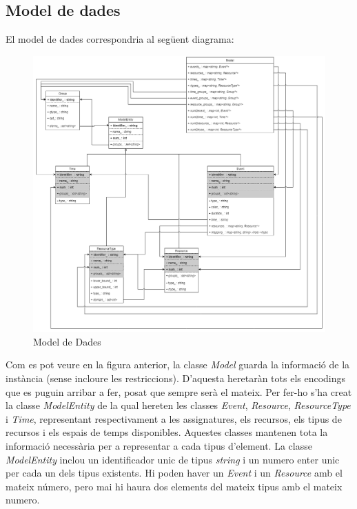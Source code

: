 \documentclass[11pt,a4paper,twoside]{report}
\begin{document}
  \subsection{Model de dades}

  El model de dades correspondria al següent diagrama:
  \begin{figure}[H]
    \includegraphics[width=\textwidth]{Diagrames/ModelDades.png}
    \caption{Model de Dades}
    \label{fig:DataModel}
  \end{figure}

  Com es pot veure en la figura anterior, la classe \textit{Model} guarda la informació de la instància (sense incloure les restriccions). D'aquesta heretaràn tots els encodings que es puguin arribar a fer, posat que sempre serà el mateix.
  Per fer-ho s'ha creat la classe \textit{ModelEntity} de la qual hereten les classes \textit{Event}, \textit{Resource}, \textit{ResourceType} i \textit{Time},
  representant respectivament a les assignatures, els recursos, els tipus de recursos i els espais de temps disponibles. Aquestes classes mantenen tota la informació necessària per a representar a cada tipus d'element. La classe \textit{ModelEntity}
  inclou un identificador unic de tipus \textit{string} i un numero enter unic per cada un dels tipus existents. Hi poden haver un \textit{Event} i un \textit{Resource} amb el mateix número, pero mai hi haura dos elements del mateix tipus amb el mateix numero.
\end{document}
